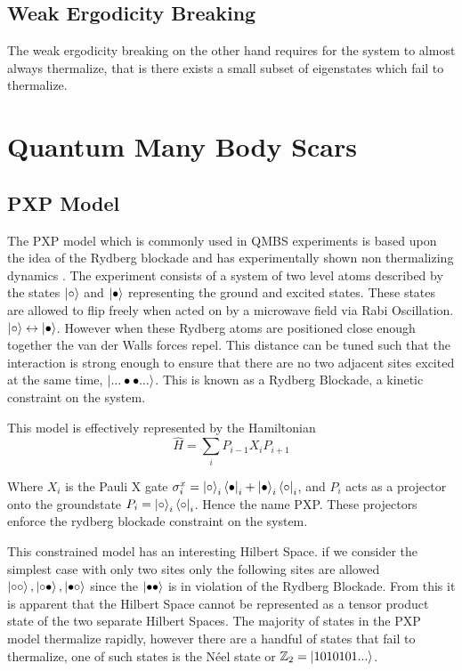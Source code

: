 \subsection{Weak Ergodicity Breaking}
The weak ergodicity breaking on the other hand requires for the system to almost always thermalize, that is there exists a small subset of eigenstates which fail to thermalize. 
\section{Quantum Many Body Scars}

\subsection{PXP Model}
The PXP model which is commonly used in QMBS experiments is based upon the idea of the Rydberg blockade and has experimentally shown non thermalizing dynamics \cite{bernien_probing_2017}.  The experiment consists of a system of two level atoms described by the states $\ket{\circ}$ and $\ket{\bullet}$ representing the ground and excited states. These states are allowed to flip freely when acted on by a microwave field via Rabi Oscillation. $\ket{\circ} \leftrightarrow \ket{\bullet}$. However when these Rydberg atoms are positioned close enough together the van der Walls forces repel. This distance can be tuned such that the interaction is strong enough to ensure that there are no two adjacent sites excited at the same time, $\ket{...\bullet \bullet ...}$. This is known as a Rydberg Blockade, a kinetic constraint on the system.

This model is effectively represented by the Hamiltonian 
\begin{equation}
\hat{H} = \sum_i P_{i-1}X_iP_{i+1}
\end{equation}

Where $X_i$ is the Pauli X gate $\sigma^x_i = \ket{\circ}_i\bra{\bullet}_i+\ket{\bullet}_i\bra{\circ}_i$, and $P_i$ acts as a projector onto the groundstate $P_i = \ket{\circ}_i\bra{\circ}_i$. Hence the name PXP. These projectors enforce the rydberg blockade constraint on the system.  

This constrained model has an interesting Hilbert Space. if we consider the simplest case with only two sites only the following sites are allowed $\ket{\circ \circ},\ket{\circ \bullet},\ket{\bullet \circ}$ since the $\ket{\bullet \bullet}$ is in violation of the Rydberg Blockade. From this it is apparent that the Hilbert Space cannot be represented as a tensor product state of the two separate Hilbert Spaces.
The majority of states in the PXP model thermalize rapidly, however there are a handful of states that fail to thermalize, one of such states is the N\'eel state or $\mathbb{Z}_2 = \ket{1010101...}$. \cite{turner_quantum_2018-1, chen_dynamics_2022}

